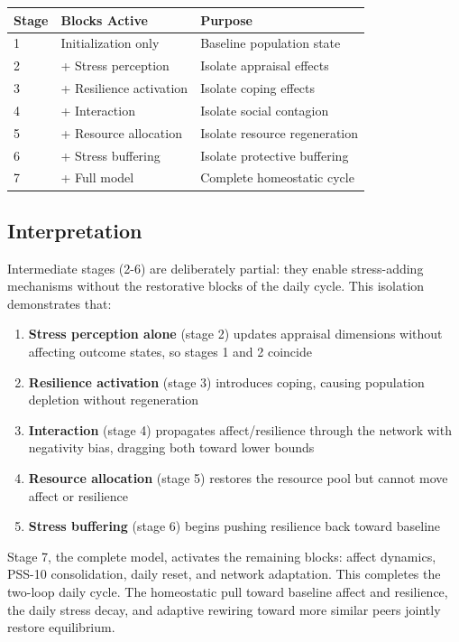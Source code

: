 \documentclass[
  letterpaper,
  DIV=11,
  numbers=noendperiod]{scrartcl}
\providecommand{\tightlist}{%
  \setlength{\itemsep}{0pt}\setlength{\parskip}{0pt}}
\begin{document}
\begin{tabularx}{\textwidth}{p{1.5cm}p{4cm}X}
\toprule
\textbf{Stage} & \textbf{Blocks Active} & \textbf{Purpose} \\
\midrule
1 & Initialization only & Baseline population state \\
2 & + Stress perception & Isolate appraisal effects \\
3 & + Resilience activation & Isolate coping effects \\
4 & + Interaction & Isolate social contagion \\
5 & + Resource allocation & Isolate resource regeneration \\
6 & + Stress buffering & Isolate protective buffering \\
7 & + Full model & Complete homeostatic cycle \\
\bottomrule
\end{tabularx}

\subsection{Interpretation}\label{interpretation}

Intermediate stages (2-6) are deliberately partial: they enable
stress-adding mechanisms without the restorative blocks of the daily
cycle. This isolation demonstrates that:

\begin{enumerate}
\def\labelenumi{\arabic{enumi}.}
\tightlist
\item
  \textbf{Stress perception alone} (stage 2) updates appraisal
  dimensions without affecting outcome states, so stages 1 and 2
  coincide
\item
  \textbf{Resilience activation} (stage 3) introduces coping, causing
  population depletion without regeneration
\item
  \textbf{Interaction} (stage 4) propagates affect/resilience through
  the network with negativity bias, dragging both toward lower bounds
\item
  \textbf{Resource allocation} (stage 5) restores the resource pool but
  cannot move affect or resilience
\item
  \textbf{Stress buffering} (stage 6) begins pushing resilience back
  toward baseline
\end{enumerate}

Stage 7, the complete model, activates the remaining blocks: affect
dynamics, PSS-10 consolidation, daily reset, and network adaptation.
This completes the two-loop daily cycle. The homeostatic pull toward
baseline affect and resilience, the daily stress decay, and adaptive
rewiring toward more similar peers jointly restore equilibrium.
\end{document}
